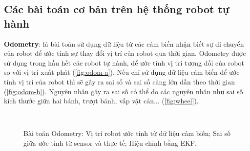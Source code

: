 \subsection{Các bài toán cơ bản trên hệ thống robot tự hành}
\textbf{Odometry}: là bài toán sử dụng dữ liệu từ các cảm biến nhận biết sự di chuyển của robot để ước tính sự thay đổi vị trí của robot qua thời gian. Odometry được sử dụng trong hầu hết các robot tự hành, để ước tính vị trí tương đối của robot so với vị trí xuất phát (\figurename{\ref{fig:odom-a}}).
Nếu chỉ sử dụng dữ liệu cảm biến để ước tính vị trí của robot thì sẽ gây ra sai số và sai số càng lớn dần theo thời gian (\figurename{\ref{fig:odom-b}}). Nguyên nhân gây ra sai số có thể do các nguyên nhân như sai số kích thước giữa hai bánh, trượt bánh, vấp vật cản... (\figurename{\ref{fig:wheel}}). 
\begin{figure}[htp]
	\centering
	\\
	\hspace{8pt}
	\caption[]{Bài toán Odometry: Vị trí robot ước tính từ dữ liệu cảm biến;  Sai số giữa ước tính từ sensor và thực tế;  Hiệu chỉnh bằng EKF.}
	\label{fig:odom}
\end{figure}

